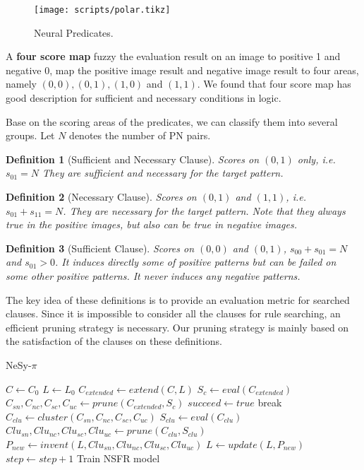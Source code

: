 \documentclass[
]{ceurart}
\newtheorem{definition}{Definition}[section]
\begin{document}
		\begin{figure}[t]
	\centering
	\texttt{[image: scripts/polar.tikz]}
	\caption{Neural Predicates.}
	\label{fig:nesy.}
	\end{figure}

	
	A \textbf{four score map} fuzzy the evaluation result on an image to positive 1 and negative 0, map the positive image result and negative image result to four areas, namely $ (0,0), (0,1), (1,0) $ and $ (1,1) $. We found that four score map has good description for sufficient and necessary conditions in logic.
	
	Base on the scoring areas of the predicates, we can classify them into several groups. Let $ N $ denotes the number of PN pairs.
	
	\begin{definition}[Sufficient and Necessary Clause]
		Scores on $ (0,1) $ only, i.e. $ s_{01} =N$ They are sufficient and necessary for the target pattern.
	\end{definition}
	
	\begin{definition}[Necessary Clause]
		Scores on $ (0,1) $ and $ (1,1) $, i.e. $ s_{01} + s_{11} = N $. They are necessary for the target pattern. Note that they always true in the positive images, but also can be true in negative images.
	\end{definition}
	
	\begin{definition}[Sufficient Clause]
		Scores on $ (0,0) $ and $ (0,1) $, $ s_{00}+s_{01} = N $ and $ s_{01}>0 $. It induces directly some of positive patterns but can be failed on some other positive patterns. It never induces any negative patterns.
	\end{definition}
	
	The key idea of these definitions is to provide an evaluation metric for searched clauses. Since it is impossible to consider all the clauses for rule searching, an efficient pruning strategy is necessary. Our pruning strategy is mainly based on the satisfaction of the clauses on these definitions. 
	
	\begin{algorithm}
		\caption{NeSy-$ \pi $}\label{alg:pi}
		\begin{algorithmic}
			\State $C \gets C_0$
			\State $L \gets L_0$
			\State $ C_{extended} \gets extend(C, L)$
			\State $S_c \gets  eval (C_{extended})$
			\State $C_{sn},C_{nc},C_{sc}, C_{uc} \gets  prune(C_{extended}, S_c)$
			\EndFor 
			\State $succeed \gets true$
			\State break
			\EndIf 
			\State $ C_{clu} \gets  cluster(C_{sn},C_{nc},C_{sc}, C_{uc} ) $
			\State $ S_{clu} \gets eval(C_{clu})$
			\State $ Clu_{sn}, Clu_{nc}, Clu_{sc}, Clu_{uc} \gets  prune(C_{clu}, S_{clu})$  
			\State $P_{new} \gets invent(L, Clu_{sn}, Clu_{nc}, Clu_{sc}, Clu_{uc})$
			\State $ L \gets update(L, P_{new})  $
			\State $step \gets step + 1$
			\EndWhile
			\State Train NSFR model
		\end{algorithmic}
	\end{algorithm}
\end{document}
